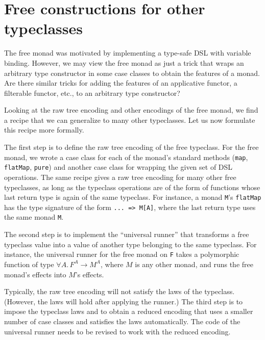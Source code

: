 \section{Free constructions for other typeclasses}

The free monad was motivated by implementing a type-safe DSL with
variable binding. However, we may view the free monad as just a trick
that wraps an arbitrary type constructor in some case classes to obtain
the features of a monad. Are there similar tricks for adding the features
of an applicative functor, a filterable functor, etc., to an arbitrary
type constructor? 

Looking at the raw tree encoding and other encodings of the free monad,
we find a recipe that we can generalize to many other typeclasses.
Let us now formulate this recipe more formally.

The first step is to define the raw tree encoding of the free typeclass.
For the free monad, we wrote a case class for each of the monad\textsf{'}s
standard methods (\lstinline!map!,
\lstinline!flatMap!, \lstinline!pure!)
and another case class for wrapping the given set of DSL operations.
The same recipe gives a raw tree encoding for many other free typeclasses,
as long as the typeclass operations are of the form of functions whose
last return type is again of the same typeclass. For instance, a monad
\lstinline!M!\textsf{'}s \lstinline!flatMap!
has the type signature of the form \lstinline!... => M[A]!,
where the last return type uses the same monad \lstinline!M!.

The second step is to implement the \textsf{``}universal runner\textsf{''} that transforms
a free typeclass value into a value of another type belonging to the
same typeclass. For instance, the universal runner for the free monad
on \lstinline!F! takes
a polymorphic function of type $\forall A.\,F^{A}\rightarrow M^{A}$,
where $M$ is any other monad, and runs the free monad\textsf{'}s effects into
$M$\textsf{'}s effects.

Typically, the raw tree encoding will not satisfy the laws of the
typeclass. (However, the laws will hold after applying the runner.)
The third step is to impose the typeclass laws and to obtain a reduced
encoding that uses a smaller number of case classes and satisfies
the laws automatically. The code of the universal runner needs to
be revised to work with the reduced encoding.

